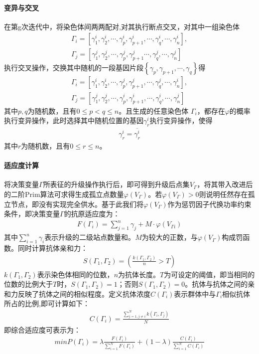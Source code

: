 \documentclass{whutmod}
\begin{document}
    	\paragraph{变异与交叉}
    	在第g次迭代中，将染色体间两两配对,对其执行断点交叉，对其中一组染色体
    		\begin{gather*}
    \Gamma_i=[\gamma_1^i,\gamma_2^i,\cdots, \gamma_p^i,\gamma_{p+1}^i,\cdots,\gamma_q^i,\cdots,\gamma_n^i],\\
    \Gamma_j=[\gamma_1^j,\gamma_2^j,\cdots, \gamma_p^j,\gamma_{p+1}^j\cdots,\gamma_q^j,\cdots,\gamma_n^j]
    		\end{gather*}
    	执行交叉操作，交换其中随机的一段基因片段$\left \{ \gamma_p,\gamma_{p+1},\cdots,\gamma_q\right \}$得
    		\begin{gather*}
    	\Gamma_i=[\gamma_1^i,\gamma_2^i,\cdots, \gamma_p^j,\gamma_{p+1}^j,\cdots,\gamma_q^j,\cdots,\gamma_n^i],\\
    	\Gamma_j=[\gamma_1^j,\gamma_2^j,\cdots, \gamma_p^i,\gamma_{p+1}^i,\cdots,\gamma_q^i,\cdots,\gamma_n^j]
    	\end{gather*}
    	其中$p,q$为随机数，且有$0\leqslant p<q\leqslant n$。且生成的任意染色体 $\Gamma_i$，都存在$\varphi $的概率执行变异操作，此时选择其中随机位置的基因$\gamma_r^i$执行变异操作，使得
    	\begin{gather*}
       \gamma_r^i=\overline{\gamma_r^i}
    	\end{gather*}
    	其中$r$为随机数，且有$0\leqslant r\leqslant n$。

     	\paragraph{适应度计算}
    将决策变量$\Gamma$所表征的升级操作执行后，即可得到升级后点集$V_{\Gamma}$，将其带入改进后的二阶Prim算法可求得生成孤立点数量$\varphi(V_{\Gamma})$。若$\varphi(V_{\Gamma})>0$则说明任然存在孤立节点，即没有实现完全供水。基于此我们将$\varphi(V_{\Gamma})$作为惩罚因子代换功率约束条件，即决策变量$\Gamma$的抗原适应度为：
    	\begin{gather}
    	F(\Gamma_i)=\sum_{j=1}^{n}\gamma_j+ M\cdot  \varphi(V_{\Gamma i})
    	\end{gather}
    其中$\sum_{i=1}^{n}\gamma_i$表示升级的二级站点数量和。$M$为较大的正数，与$\varphi(V_{\Gamma})$构成罚函数。同时计算抗体亲和力：
    	\begin{gather}
    	S(\Gamma_1,\Gamma_2)=(\frac{k(\Gamma_1,\Gamma_2)}{n}>T)
        \end{gather}
    $k(\Gamma_1,\Gamma_2)$表示染色体相同的位数，$n$为抗体长度。$T$为可设定的阈值，即当相同的位数的比例大于$T$时，$S(\Gamma_1,\Gamma_2)=1$；否则$S(\Gamma_1,\Gamma_2)=0$。抗体与抗体之间的亲和力反映了抗体之间的相似程度。定义抗体浓度$C(\Gamma_i)$表示群体中与$\Gamma_i$相似抗体所占的比例,即可计算如下：
     \begin{gather}
     C(\Gamma_i)=\frac{\sum _{j=1,j\neq i}^N k(\Gamma_i,\Gamma_j)}{N}
     \end{gather}
     即综合适应度可表示为：
  	 \begin{gather}
  min	P(\Gamma_i)=\lambda \frac{F(\Gamma_i)}{\sum _{i=1}^N F(\Gamma_i)}+(1-\lambda )\frac{C(\Gamma_i)}{\sum _{i=1}^N C(\Gamma_i)}
  	\end{gather}
\end{document}
